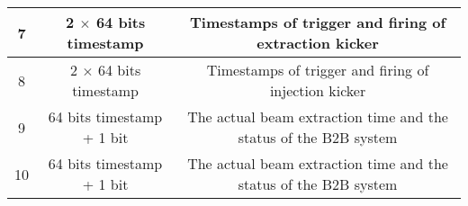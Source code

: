 \begin{landscape}
\begin{table}[!htb]
\begin{center}
\begin{tabular}{ | c | c | c | c | c | c |}
7&	\multicolumn{3}{c|}{2 $\times$ 64 bits timestamp} &\multicolumn{2}{c|}{ Timestamps of trigger and firing of extraction kicker}\\ \hline
8&	\multicolumn{3}{c|}{2 $\times$ 64 bits timestamp} &	\multicolumn{2}{c|}{Timestamps of trigger and firing of injection kicker}\\ \hline

9&	\multicolumn{3}{c|}{64 bits timestamp + 1 bit}&	\multicolumn{2}{c|}{The actual beam extraction time and the status of the B2B system}  \\ \hline

10& \multicolumn{3}{c|}{64 bits timestamp + 1 bit}	&	\multicolumn{2}{c|}{The actual beam extraction time and the status of the B2B system} \\ \hline

    \end{tabular}
\end{center}
\end{table}
\end{landscape} 